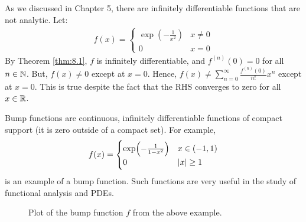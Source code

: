 \begin{nexample}{}{}
    As we discussed in Chapter 5, there are infinitely differentiable functions that are not analytic. Let:
    \begin{align*}
        f(x) = \begin{cases}
            \exp(-\frac{1}{x^2}) & x \neq 0
            \\ 0 & x = 0
        \end{cases}
    \end{align*}
    By Theorem \ref{thm:8.1}, $f$ is infinitely differentiable, and $f^{(n)}(0) = 0$ for all $n \in \mathbb{N}$. But, $f(x) \neq 0$ except at $x = 0$. Hence, $f(x) \neq \sum_{n=0}^\infty \frac{f^{(n)}(0)}{n!}x^n$ except at $x = 0$. This is true despite the fact that the RHS converges to zero for all $x \in \mathbb{R}$. 
\end{nexample}

\begin{nexample}{}{}
    Bump functions are continuous, infinitely differentiable functions of compact support (it is zero outside of a compact set). For example, 
    \begin{align*}
        f(x) = \begin{cases}
            \exp(-\frac{1}{1-x^2}) & x \in (-1, 1)
            \\ 0 & \abs{x} \geq 1
        \end{cases}
    \end{align*}
    is an example of a bump function. Such functions are very useful in the study of functional analysis and PDEs.
\end{nexample}
\begin{figure}[htbp]
    \centering
    
    \caption{Plot of the bump function $f$ from the above example.}
    \label{fig50}
\end{figure}

